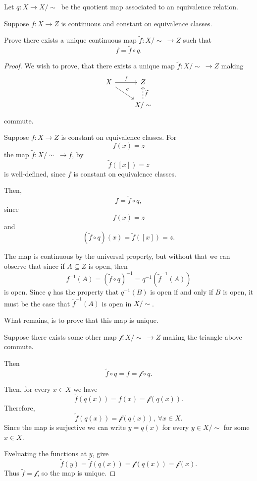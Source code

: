 \documentclass[11pt]{article}
\begin{document}
\begin{prob}
    Let $q : X \to X/\sim \ $ be 
    the quotient map associated to 
    an equivalence relation. 

    Suppose $f : X \to Z$ is continuous and 
    constant on equivalence classes. 

    Prove there exists a unique continuous 
    map $\widetilde{f} : X /\sim \ \to Z$ 
    such that 
    \[
        f = \widetilde f \circ q. 
    \]
\end{prob}
\begin{proof}
    We wish to prove, that there exists 
    a unique map $\widetilde f : X/\sim \ \to Z$ making 
    \[
        \begin{tikzcd}
            X \ar[dr, "q"] 
            \ar[r, "f"] & Z \\ 
            & X/\sim \ar[u, dashed, "\widetilde{f}"']
        \end{tikzcd}
    \]
    commute. 

    Suppose $f : X \to Z$ is constant on 
    equivalence classes. 
    For 
    \[
        f(x) = z 
    \]
    the map $\widetilde f : X/\sim \ \to f$, by  
    \[
        \widetilde f([x]) = z 
    \]
    is well-defined, since $f$ is constant on equivalence 
    classes.
    
    Then, 
    \[
        f = \widetilde f \circ q, 
    \] 
    since 
    \[
        f(x) = z 
    \]
    and 
    \[
        (\widetilde f \circ q)(x) 
        = \widetilde f([x]) = z. 
    \]

    The map is continuous by the universal property, 
    but without that we can observe that since 
    if $A \subseteq Z$ is open, then 
    \[
        f^{-1}(A) = (\widetilde f \circ q)^{-1} 
        = q^{-1}(\widetilde f^{-1}(A)) 
    \]
    is open. Since $q$ has the property that 
    $q^{-1}(B)$ is open if and only if $B$ is open, 
    it must be the case that $\widetilde f^{-1}(A)$ 
    is open in $X / \sim$. 

    What remains, is to prove that this map is unique. 

    Suppose there exists some other map 
    $\mathcal f : X/\sim \ \to Z$ making the 
    triangle above commute. 

    Then 
    \[
        \widetilde f \circ q = f = 
        \mathcal f \circ q. 
    \]

    Then, for every $x \in X$ we have 
    \[
        \widetilde f(q(x)) = f(x) = 
        \mathcal f(q(x)). 
    \]
    Therefore, 
    \[
        \widetilde f(q(x)) = \mathcal f(q(x)), \ \forall x \in X. 
    \]
    Since the map is surjective we can write 
    $y = q(x)$ for every $y \in X/\sim$ for some 
    $x \in X$. 

    Eveluating the functions at $y$, give 
    \[
        \widetilde f(y) = 
        \widetilde f(q(x)) = \mathcal f(q(x)) 
        = \mathcal f(x). 
    \]
    Thus $\widetilde f = \mathcal f$, 
    so the map is unique. 

\end{proof}
\end{document}
